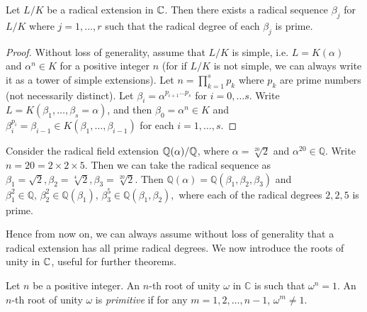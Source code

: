 \begin{theorem} \label{thm:radical-single-prime}
	Let $L / K$ be a radical extension in $\mathbb C$. Then there exists a radical sequence $\beta_j$ for $L / K$ where $j=1, \dots, r$ such that the radical degree of each $\beta_j$ is prime.
\end{theorem}

\begin{proof}
	Without loss of generality, assume that $L/K$ is simple, i.e.  $L = K (\alpha)$ and $\alpha ^ n \in K$ for a positive integer $n$ (for if $L/K$ is not simple, we can always write it as a tower of simple extensions). Let $n = \prod_{k=1}^{s} p_{k}$ where $p_{k}$ are prime numbers (not necessarily distinct). Let $\beta_{i} = \alpha^ {p_{i + 1} \dots  p_{s}}$ for $i = 0, \dots s$. Write $L = K(\beta_1,  \dots, \beta_s = \alpha)$, and then $\beta_0 = \alpha^n \in K$ and  $\beta_i ^ {p_i} = \beta_{i-1} \in K(\beta_1, \dots, \beta_{i - 1})$ for each $i  = 1, \dots, s$. 
\end{proof}

\begin{example} \label{exm:radical-sequence-prime}
	Consider the radical field extension $\mathbb Q(\alpha) / \mathbb Q$, where $\alpha = \sqrt[20]{2}$ and $\alpha ^ {20} \in \mathbb Q$. Write $n = 20 =  2 \times 2 \times 5 $. Then we can take the radical sequence as $\beta_1 = \sqrt 2, \beta_2 = \sqrt[4]{2}, \beta_3 = \sqrt[20]{2}$. Then $\mathbb Q(\alpha) = \mathbb Q(\beta_1, \beta_2, \beta_3)$ and 
	$
	\beta_1 ^ 2 \in \mathbb Q, \, \beta_2 ^ 2 \in \mathbb Q(\beta_1), \, \beta_3^5 \in \mathbb Q (\beta_1, \beta_2),
	$
	where each of the radical degrees $2, 2, 5$ is prime.
\end{example}

Hence from now on, we can always assume without loss of generality that a radical extension has all prime radical degrees. We now introduce the roots of unity in $\mathbb C$, useful for further theorems. 


\begin{definition}
	Let $n$ be a positive integer. An $n$-th root of unity $\omega$ in $\mathbb C$ is such that $\omega ^ n = 1$. An $n$-th root of unity $\omega$ is \textit{primitive} if for any $m = 1, 2, \dots, n - 1$, $\omega ^ m \neq 1$.
\end{definition}


